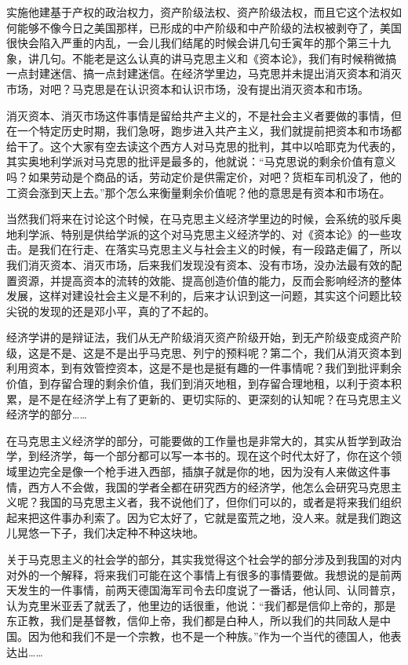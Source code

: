 \documentclass[UTF8, 12pt, a4paper]{ctexrep}
\begin{document}
实施他建基于产权的政治权力，资产阶级法权、资产阶级法权，而且它这个法权如何能够不像今日之美国那样，已形成的中产阶级和中产阶级的法权被剥夺了，美国很快会陷入严重的内乱，一会儿我们结尾的时候会讲几句壬寅年的那个第三十九象，讲几句。不能老是这么认真的讲马克思主义和《资本论》，我们有时候稍微搞一点封建迷信、搞一点封建迷信。在经济学里边，马克思并未提出消灭资本和消灭市场，对吧？马克思是在认识资本和认识市场，没有提出消灭资本和市场。

消灭资本、消灭市场这件事情是留给共产主义的，不是社会主义者要做的事情，但在一个特定历史时期，我们急呀，跑步进入共产主义，我们就提前把资本和市场都给干了。这个大家有空去读这个西方人对马克思的批判，其中以哈耶克为代表的，其实奥地利学派对马克思的批评是最多的，他就说：“马克思说的剩余价值有意义吗？如果劳动是个商品的话，劳动定价是供需定价，对吧？货柜车司机没了，他的工资会涨到天上去。”那个怎么来衡量剩余价值呢？他的意思是有资本和市场在。

当然我们将来在讨论这个时候，在马克思主义经济学里边的时候，会系统的驳斥奥地利学派、特别是供给学派的这个对马克思主义经济学的、对《资本论》的一些攻击。是我们在行走、在落实马克思主义与社会主义的时候，有一段路走偏了，所以我们消灭资本、消灭市场，后来我们发现没有资本、没有市场，没办法最有效的配置资源，并提高资本的流转的效能、提高创造价值的能力，反而会影响经济的整体发展，这样对建设社会主义是不利的，后来才认识到这一问题，其实这个问题比较尖锐的发现的还是邓小平，真的了不起的。

经济学讲的是辩证法，我们从无产阶级消灭资产阶级开始，到无产阶级变成资产阶级，这是不是、这是不是出乎马克思、列宁的预料呢？第二个，我们从消灭资本到利用资本，到有效管控资本，这是不是也是挺有趣的一件事情呢？我们到批评剩余价值，到存留合理的剩余价值，我们到消灭地租，到存留合理地租，以利于资本积累，是不是在经济学上有了更新的、更切实际的、更深刻的认知呢？在马克思主义经济学的部分……

在马克思主义经济学的部分，可能要做的工作量也是非常大的，其实从哲学到政治学，到经济学，每一个部分都可以写一本书的。现在这个时代太好了，你在这个领域里边完全是像一个枪手进入西部，插旗子就是你的地，因为没有人来做这件事情，西方人不会做，我国的学者全都在研究西方的经济学，他怎么会研究马克思主义呢？我国的马克思主义者，我不说他们了，但你们可以的，或者是将来我们组织起来把这件事办利索了。因为它太好了，它就是蛮荒之地，没人来。就是我们跑这儿晃悠一下子，我们决定种不种这块地。

关于马克思主义的社会学的部分，其实我觉得这个社会学的部分涉及到我国的对内对外的一个解释，将来我们可能在这个事情上有很多的事情要做。我想说的是前两天发生的一件事情，前两天德国海军司令去印度说了一番话，他认同、认同普京，认为克里米亚丢了就丢了，他里边的话很重，他说：“我们都是信仰上帝的，那是东正教，我们是基督教，信仰上帝，我们都是白种人，所以我们的共同敌人是中国。因为他和我们不是一个宗教，也不是一个种族。”作为一个当代的德国人，他表达出……
\end{document}
